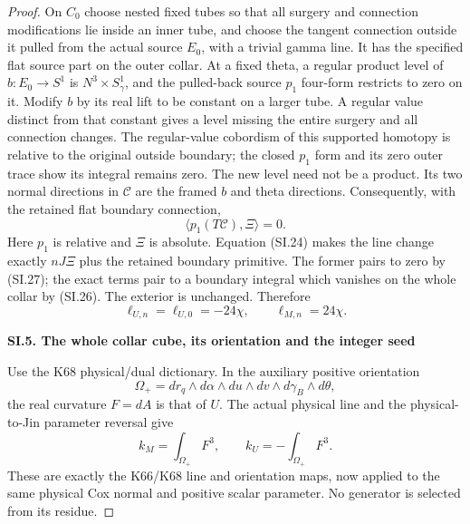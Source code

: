 \begin{proof}
On \(C_0\) choose nested fixed tubes so that all surgery and
connection modifications lie inside an inner tube, and choose
the tangent connection outside it pulled from the actual source
\(E_0\), with a trivial gamma line. It has the specified flat source
part on the outer collar. At a fixed theta, a regular product level
of \(b:E_0\to S^1\) is \(N^3\times S^1_\gamma\), and the pulled-back
source \(p_1\) four-form restricts to zero on it. Modify \(b\) by its
real lift to be constant on a larger tube. A regular value distinct
from that constant gives a level missing the entire surgery and
all connection changes. The regular-value cobordism of this
supported homotopy is relative to the original outside boundary;
the closed \(p_1\) form and its zero outer trace show its integral
remains zero. The new level need not be a product. Its two normal
directions in \(\mathcal C\) are the framed \(b\) and theta directions.
Consequently, with the retained flat boundary connection,
\[
 \langle p_1(T\mathcal C),\Xi\rangle=0.              \tag{SI.27}
\]
Here \(p_1\) is relative and \(\Xi\) is absolute. Equation (SI.24)
makes the line change exactly \(nJ\Xi\) plus the retained boundary
primitive. The former pairs to zero by (SI.27); the exact terms
pair to a boundary integral which vanishes on the whole collar
by (SI.26). The exterior is unchanged. Therefore
\[
 \ell_{U,n}=\ell_{U,0}=-24\chi,
 \qquad\ell_{M,n}=24\chi.                           \tag{SI.28}
\]

\par

\medskip\noindent\textbf{SI.5. The whole collar cube, its orientation and the integer seed}

\par\nobreak

Use the K68 physical/dual dictionary. In the auxiliary positive
orientation
\[
 \Omega_+=dr_q\wedge d\alpha\wedge du\wedge dv
                        \wedge d\gamma_B\wedge d\theta,
\]
the real curvature \(F=dA\) is that of \(U\). The actual physical
line and the physical-to-Jin parameter reversal give
\[
 k_M=\int_{\Omega_+}F^3,
 \qquad k_U=-\int_{\Omega_+}F^3.                     \tag{SI.29}
\]
These are exactly the K66/K68 line and orientation maps, now
applied to the same physical Cox normal and positive scalar
parameter. No generator is selected from its residue.


\end{proof}
